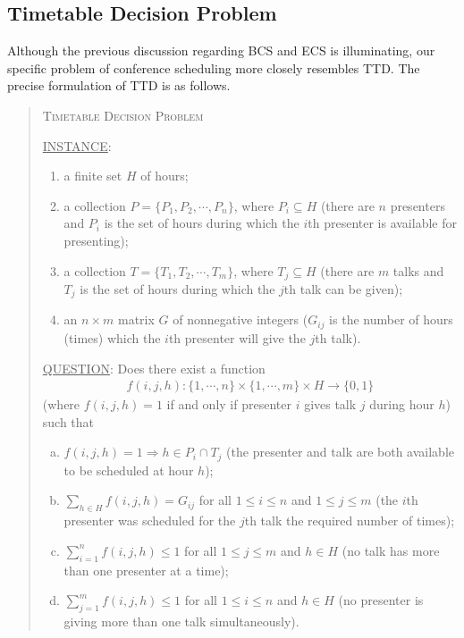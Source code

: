 \documentclass{svjour3}                     %
\begin{document}
\subsection{Timetable Decision Problem}
Although the previous discussion regarding BCS and ECS is illuminating, our specific problem of conference scheduling more closely resembles TTD. The precise formulation of TTD is as follows.
\begin{quote}
	\textsc{Timetable Decision Problem}
	
	\underline{INSTANCE}:
	\begin{enumerate}
		\item a finite set $H$ of hours;
		\item a collection $P = \{P_1, P_2, \cdots, P_n\}$, where $P_i \subseteq H$ (there are $n$ presenters and $P_i$ is the set of hours during which the $i$th presenter is available for presenting);
		\item a collection $T = \{T_1, T_2, \cdots, T_m\}$, where $T_j \subseteq H$ (there are $m$ talks and $T_j$ is the set of hours during which the $j$th talk can be given);
		\item an $n \times m$ matrix $G$ of nonnegative integers ($G_{ij}$ is the number of hours (times) which the $i$th presenter will give the $j$th talk).
	\end{enumerate}
	\underline{QUESTION}: Does there exist a function 
	\begin{gather*}
		f(i,j,h) : \{1,\cdots,n\} \times \{1,\cdots,m\} \times H \rightarrow \{0,1\}
	\end{gather*}
	(where $f(i,j,h)=1$ if and only if presenter $i$ gives talk $j$ during hour $h$) such that
	\begin{enumerate}[(a)]
		\item $f(i,j,h) = 1 \Rightarrow h \in P_i \cap T_j$ (the presenter and talk are both available to be scheduled at hour $h$);
		\item $\sum\limits_{h \in H} f(i,j,h) = G_{ij}$ for all $1 \le i \le n$ and $1 \le j \le m$ (the $i$th presenter was scheduled for the $j$th talk the required number of times);
		\item $\sum\limits_{i=1}^n f(i,j,h) \le 1$ for all $1 \le j \le m$ and $h \in H$ (no talk has more than one presenter at a time);
		\item $\sum\limits_{j=1}^m f(i,j,h) \le 1$ for all $1 \le i \le n$ and $h \in H$ (no presenter is giving more than one talk simultaneously).
	\end{enumerate}
\end{quote}
\end{document}
